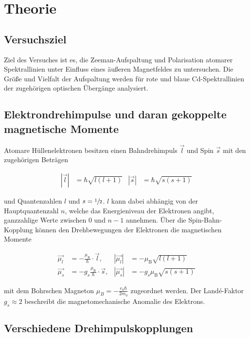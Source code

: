 \section{Theorie}
\label{sec:Theorie}

\subsection{Versuchsziel}

Ziel des Versuches ist es, die Zeeman-Aufspaltung und Polarisation atomarer Spektrallinien
unter Einfluss eines äußeren Magnetfeldes zu untersuchen. Die Größe und Vielfalt 
der Aufspaltung werden für rote und blaue Cd-Spektrallinien der zugehörigen
optischen Übergänge analysiert.

\subsection{Elektrondrehimpulse und daran gekoppelte magnetische Momente}

Atomare Hüllenelektronen besitzen einen Bahndrehimpuls $\vec{l}$ und Spin $\vec{s}$
mit den zugehörigen Beträgen

\vspace{-25pt}
\begin{align}
    |\vec{l}| &= \hbar \sqrt{l(l+1)} & |\vec{s}| &= \hbar \sqrt{s(s+1)}
\end{align}

und Quantenzahlen $l$ und $s = \sfrac{1}{2}$. $l$ kann dabei abhängig von der Hauptquantenzahl $n$,
welche das Energieniveau der Elektronen angibt, ganzzahlige Werte zwischen $0$ und $n-1$ annehmen.
Über die Spin-Bahn-Kopplung können den Drehbewegungen der Elektronen die magnetischen Momente 

\vspace{-15pt}
\begin{align}
    \vec{\mu_l} &= - \frac{\mu_\text{B}}{\hbar} \cdot \vec{l}, & |\vec{\mu_l}|& = - \mu_\text{B} \sqrt{l(l+1)}\\
    \vec{\mu_s} &= - g_s \frac{\mu_\text{B}}{\hbar} \cdot \vec{s}, & |\vec{\mu_s}| &= - g_s \mu_\text{B} \sqrt{s(s+1)}
\end{align}

mit dem Bohrschen Magneton $\mu_B = -\frac{e_0 \hbar}{2 m_0}$ zugeordnet werden.
Der Landé-Faktor $g_s \approx 2$ beschreibt die magnetomechanische Anomalie des Elektrons.

\subsection{Verschiedene Drehimpulskopplungen}


